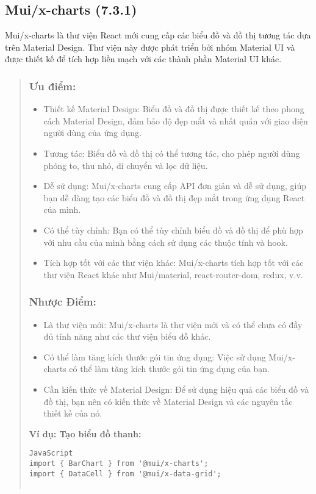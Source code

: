 \subsection{Mui/x-charts (7.3.1)}
Mui/x-charts là thư viện React mới cung cấp các biểu đồ và đồ thị tương tác dựa trên Material Design. Thư viện này được phát triển bởi nhóm Material UI và được thiết kế để tích hợp liền mạch với các thành phần Material UI khác.

\begin{quote}
\subsubsection{Ưu điểm:}
\begin{itemize}

    \item Thiết kế Material Design: Biểu đồ và đồ thị được thiết kế theo phong cách Material Design, đảm bảo độ đẹp mắt và nhất quán với giao diện người dùng của ứng dụng.
    \item Tương tác: Biểu đồ và đồ thị có thể tương tác, cho phép người dùng phóng to, thu nhỏ, di chuyển và lọc dữ liệu.
    \item  Dễ sử dụng: Mui/x-charts cung cấp API đơn giản và dễ sử dụng, giúp bạn dễ dàng tạo các biểu đồ và đồ thị đẹp mắt trong ứng dụng React của mình.
    \item Có thể tùy chỉnh: Bạn có thể tùy chỉnh biểu đồ và đồ thị để phù hợp với nhu cầu của mình bằng cách sử dụng các thuộc tính và hook.
    \item Tích hợp tốt với các thư viện khác: Mui/x-charts tích hợp tốt với các thư viện React khác như Mui/material, react-router-dom, redux, v.v.
\end{itemize}

\subsubsection{Nhược Điểm:}

\begin{itemize}
    \item Là thư viện mới: Mui/x-charts là thư viện mới và có thể chưa có đầy đủ tính năng như các thư viện biểu đồ khác.
    \item Có thể làm tăng kích thước gói tin ứng dụng: Việc sử dụng Mui/x-charts có thể làm tăng kích thước gói tin ứng dụng của bạn.

    \item Cần kiến thức về Material Design: Để sử dụng hiệu quả các biểu đồ và đồ thị, bạn nên có kiến thức về Material Design và các nguyên tắc thiết kế của nó.
\end{itemize}
\textbf{Ví dụ: Tạo biểu đồ thanh:}
\begin{lstlisting}
JavaScript
import { BarChart } from '@mui/x-charts';
import { DataCell } from '@mui/x-data-grid';


\end{lstlisting}
\end{quote}
